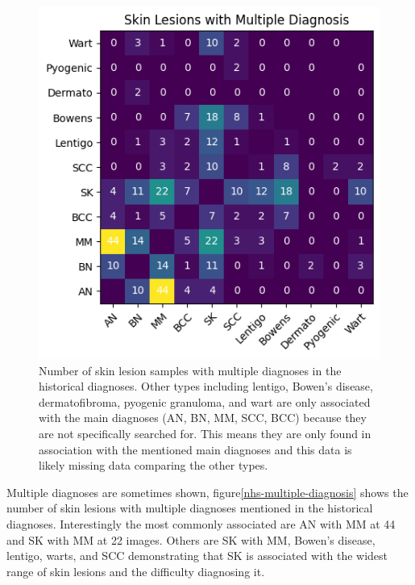 \begin{figure}
    \centering
    \includegraphics[scale=0.75]{images/nhs/nhs-multiple-diagnosis.png}
    \caption{Number of skin lesion samples with multiple diagnoses in the historical diagnoses. Other types including lentigo, Bowen's disease, dermatofibroma, pyogenic granuloma, and wart are only associated with the main diagnoses (AN, BN, MM, SCC, BCC) because they are not specifically searched for. This means they are only found in association with the mentioned main diagnoses and this data is likely missing data comparing the other types.} 
\end{figure}\label{nhs-multiple-diagnosis}

Multiple diagnoses are sometimes shown, figure\ref{nhs-multiple-diagnosis} shows the number of skin lesions with multiple diagnoses mentioned in the historical diagnoses. Interestingly the most commonly associated are AN with MM at 44 and SK with MM at 22 images. Others are SK with MM, Bowen's disease, lentigo, warts, and SCC demonstrating that SK is associated with the widest range of skin lesions and the difficulty diagnosing it.

